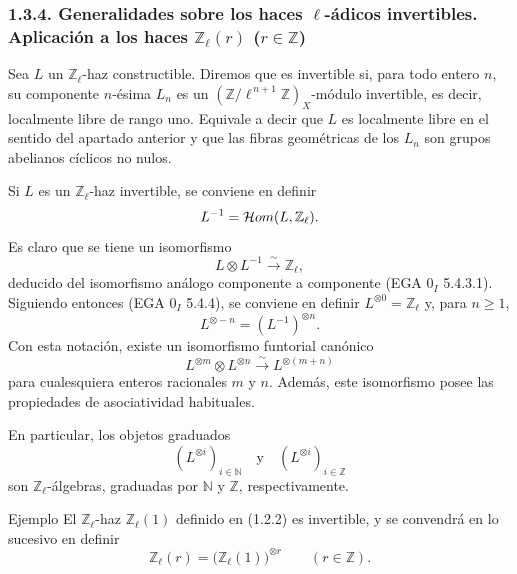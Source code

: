 \subsubsection*{1.3.4. Generalidades sobre los haces \(\ell\)-ádicos invertibles. Aplicación a los haces \(\mathbb Z_\ell(r)\) (\(r\in\mathbb Z\))}

Sea \(L\) un \(\mathbb Z_\ell\)-haz constructible. Diremos que es invertible si, para todo entero \(n\), su componente \(n\)-ésima \(L_n\) es un \((\mathbb Z/\ell^{\,n+1}\mathbb Z)_X\)-módulo invertible, es decir, localmente libre de rango uno. Equivale a decir que \(L\) es localmente libre en el sentido del apartado anterior y que las fibras geométricas de los \(L_n\) son grupos abelianos cíclicos no nulos.

Si \(L\) es un \(\mathbb Z_\ell\)-haz invertible, se conviene en definir
\[
L^{-1}=\mathcal{H}om(L,\mathbb Z_\ell).
\]
Es claro que se tiene un isomorfismo
\[
L\otimes L^{-1}\xrightarrow{\sim}\mathbb Z_\ell,
\]
deducido del isomorfismo análogo componente a componente (EGA \(0_I\) 5.4.3.1). Siguiendo entonces (EGA \(0_I\) 5.4.4), se conviene en definir \(L^{\otimes0}=\mathbb Z_\ell\) y, para \(n\ge1\),
\[
L^{\otimes -n}=(L^{-1})^{\otimes n}.
\]
Con esta notación, existe un isomorfismo funtorial canónico
\[
L^{\otimes m}\otimes L^{\otimes n}\xrightarrow{\sim}L^{\otimes(m+n)}
\]
para cualesquiera enteros racionales \(m\) y \(n\). Además, este isomorfismo posee las propiedades de asociatividad habituales.

En particular, los objetos graduados
\[
(L^{\otimes i})_{i\in\mathbb N}\quad\text{y}\quad(L^{\otimes i})_{i\in\mathbb Z}
\]
son \(\mathbb Z_\ell\)-álgebras, graduadas por \(\mathbb N\) y \(\mathbb Z\), respectivamente.

\begin{statement}{Ejemplo}
El \(\mathbb Z_\ell\)-haz \(\mathbb Z_\ell(1)\) definido en (1.2.2) es invertible, y se convendrá en lo sucesivo en definir
\[
\mathbb Z_\ell(r)=\bigl(\mathbb Z_\ell(1)\bigr)^{\otimes r}\qquad (r\in\mathbb Z).
\]
\end{statement}
